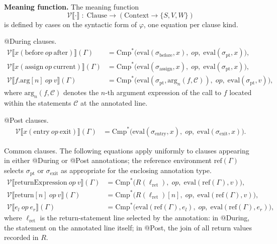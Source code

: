 \documentclass[pdflatex,sn-basic]{sn-jnl}%
\theoremstyle{thmstyleone}%
\theoremstyle{thmstyletwo}%
\theoremstyle{thmstylethree}%
\begin{document}
\smallskip
\noindent\textbf{Meaning function.}
The meaning function
\[
\mathcal{V}\llbracket \cdot \rrbracket \;:\; \text{Clause} \to (\text{Context} \to \{S, V, W\})
\]
is defined by cases on the syntactic form of $\varphi$, one equation per clause kind.

\smallskip
\noindent @During clauses.
\begin{align*}
\mathcal{V}\llbracket x(\text{before}\ \mathit{op}\ \text{after}) \rrbracket(\Gamma)
    &= \text{Cmp}^*\bigl(\text{eval}(\sigma_{\text{before}}, x),\; \mathit{op},\; \text{eval}(\sigma_{\text{pt}}, x)\bigr), \\[3pt]
\mathcal{V}\llbracket x(\text{assign}\ \mathit{op}\ \text{current}) \rrbracket(\Gamma)
    &= \text{Cmp}^*\bigl(\text{eval}(\sigma_{\text{assign}}, x),\; \mathit{op},\; \text{eval}(\sigma_{\text{pt}}, x)\bigr), \\[3pt]
\mathcal{V}\llbracket f.\text{arg}[n]\ \mathit{op}\ v \rrbracket(\Gamma)
    &= \text{Cmp}^*\bigl(\text{eval}(\sigma_{\text{pt}}, \text{arg}_n(f, \mathcal{C})),\; \mathit{op},\; \text{eval}(\sigma_{\text{pt}}, v)\bigr),
\end{align*}
where $\text{arg}_n(f, \mathcal{C})$ denotes the $n$-th argument expression of the call to $f$ located within the statements $\mathcal{C}$ at the annotated line.

\smallskip
\noindent @Post clauses.
\begin{align*}
\mathcal{V}\llbracket x(\text{entry}\ \mathit{op}\ \text{exit}) \rrbracket(\Gamma)
    &= \text{Cmp}^*\bigl(\text{eval}(\sigma_{\text{entry}}, x),\; \mathit{op},\; \text{eval}(\sigma_{\text{exit}}, x)\bigr).
\end{align*}

\smallskip
\noindent Common clauses.
The following equations apply uniformly to clauses appearing in either @During or @Post annotations; the reference environment $\text{ref}(\Gamma)$ selects $\sigma_{\text{pt}}$ or $\sigma_{\text{exit}}$ as appropriate for the enclosing annotation type.
\begin{align*}
\mathcal{V}\llbracket \text{returnExpression}\ \mathit{op}\ v \rrbracket(\Gamma)
    &= \text{Cmp}^*\bigl(R(\ell_{\text{ret}}),\; \mathit{op},\; \text{eval}(\text{ref}(\Gamma), v)\bigr), \\[3pt]
\mathcal{V}\llbracket \text{return}[n]\ \mathit{op}\ v \rrbracket(\Gamma)
    &= \text{Cmp}^*\bigl(R(\ell_{\text{ret}})[n],\; \mathit{op},\; \text{eval}(\text{ref}(\Gamma), v)\bigr), \\[3pt]
\mathcal{V}\llbracket e_l\ \mathit{op}\ e_r \rrbracket(\Gamma)
    &= \text{Cmp}^*\bigl(\text{eval}(\text{ref}(\Gamma), e_l),\; \mathit{op},\; \text{eval}(\text{ref}(\Gamma), e_r)\bigr),
\end{align*}
where $\ell_{\text{ret}}$ is the return-statement line selected by the annotation: in @During, the statement on the annotated line itself; in @Post, the join of all return values recorded in $R$.
\end{document}
